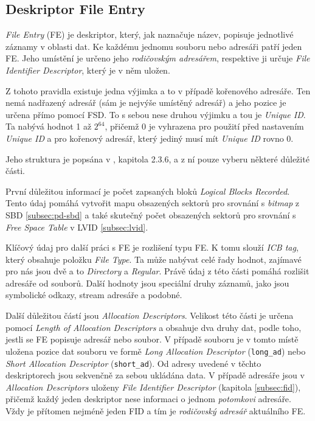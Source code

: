 \subsection{Deskriptor File Entry}
\label{subsec:fe}
\textit{File Entry} (FE) je deskriptor, který, jak naznačuje název, popisuje jednotlivé záznamy v oblasti dat. Ke každému jednomu souboru nebo adresáři patří jeden FE. Jeho umístění je určeno jeho \textit{rodičovským adresářem}, respektive ji určuje \textit{File Identifier Descriptor}, který je v něm uložen.

Z tohoto pravidla existuje jedna výjimka a to v případě kořenového adresáře. Ten nemá nadřazený adresář (sám je nejvýše umístěný adresář) a jeho pozice je určena přímo pomocí FSD. To s sebou nese druhou výjimku a tou je \textit{Unique ID}. Ta nabývá hodnot 1 až $2^{64}$, přičemž 0 je vyhrazena pro použití před nastavením \textit{Unique ID} a pro kořenový adresář, který jediný musí mít \textit{Unique ID} rovno 0.

Jeho struktura je popsána v \cite{osta-udf-0201}, kapitola 2.3.6, a z ní pouze vyberu některé důležité části.

První důležitou informací je počet zapsaných bloků \textit{Logical Blocks Recorded}. Tento údaj pomáhá vytvořit mapu obsazených sektorů pro srovnání s \textit{bitmap} z SBD \ref{subsec:pd-sbd} a také skutečný počet obsazených sektorů pro srovnání s \textit{Free Space Table} v LVID \ref{subsec:lvid}.

Klíčový údaj pro další práci s FE je rozlišení typu FE. K tomu slouží \textit{ICB tag}, který obsahuje položku \textit{File Type}. Ta může nabývat celé řady hodnot, zajímavé pro nás jsou dvě a to \textit{Directory} a \textit{Regular}. Právě údaj z této části pomáhá rozlišit adresáře od souborů. Další hodnoty jsou speciální druhy záznamů, jako jsou symbolické odkazy, stream adresáře a podobné.
 
Další důležitou částí jsou \textit{Allocation Descriptors}. Velikost této části je určena pomocí \textit{Length of Allocation Descriptors} a obsahuje dva druhy dat, podle toho, jestli se FE popisuje adresář nebo soubor. V případě souboru je v tomto místě uložena pozice dat souboru ve formě \textit{Long Allocation Descriptor} (\texttt{long\_ad}) nebo \textit{Short Allocation Descriptor} (\texttt{short\_ad}). Od adresy uvedené v těchto deskriptorech jsou sekvenčně za sebou ukládána data. V případě adresáře jsou v \textit{Allocation Descriptors} uloženy \textit{File Identifier Descriptor} (kapitola \ref{subsec:fid}), přičemž každý jeden deskriptor nese informaci o jednom \textit{potomkovi} adresáře. Vždy je přítomen nejméně jeden FID a tím je \textit{rodičovský adresář} aktuálního FE.

